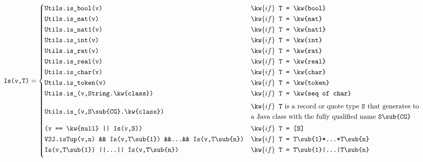 \begin{figure*}[ht]
\begin{mdframed}
\begin{equation*}
\texttt{Is(v,T)} =
\begin{cases}
  \texttt{Utils.is\_bool(v)} & \kw{if} \texttt{ T = \kw{bool}}\\[\caseSpace]

  \texttt{Utils.is\_nat(v)} & \kw{if} \texttt{ T = \kw{nat}}\\[\caseSpace]

  \texttt{Utils.is\_nat1(v)} & \kw{if} \texttt{ T = \kw{nat1}}\\[\caseSpace]

  \texttt{Utils.is\_int(v)} & \kw{if} \texttt{ T = \kw{int}}\\[\caseSpace]

  \texttt{Utils.is\_rat(v)} & \kw{if} \texttt{ T = \kw{rat}}\\[\caseSpace]

  \texttt{Utils.is\_real(v)} & \kw{if} \texttt{ T = \kw{real}}\\[\caseSpace]

  \texttt{Utils.is\_char(v)} & \kw{if} \texttt{ T = \kw{char}}\\[\caseSpace]

  \texttt{Utils.is\_token(v)} & \kw{if} \texttt{ T = \kw{token}}\\[\caseSpace]

  \texttt{Utils.is\_(v,String.\kw{class})} & \kw{if} \texttt{ T = \kw{seq of char}}\\[6.0\caseSpace]

  \texttt{Utils.is\_(v,S\sub{CG}.\kw{class})} &
  \!\begin{aligned}%
    & \kw{if} \texttt{ T} \text{ is a record or quote type } \texttt{S} \text{ that generates to}\\
    & \text{a Java class with the fully qualified name } \texttt{S\sub{CG}}
    \end{aligned}\\[10.0\caseSpace]

  \texttt{(v == \kw{null} || Is(v,S))} & \kw{if} \texttt{ T = [S]}\\[\caseSpace]

  \texttt{V2J.isTup(v,n) \&\& Is(v,T\sub{1}) \&\&...\&\& Is(v,T\sub{n})} & \kw{if} \texttt{ T = T\sub{1}*...*T\sub{n}}\\[\caseSpace]

  \texttt{Is(v,T\sub{1}) ||...|| Is(v,T\sub{n})} & \kw{if} \texttt{ T = T\sub{1}|...|T\sub{n}}\\[6.0\caseSpace]


\end{cases}
\end{equation*}
\end{mdframed}
\end{figure*}
